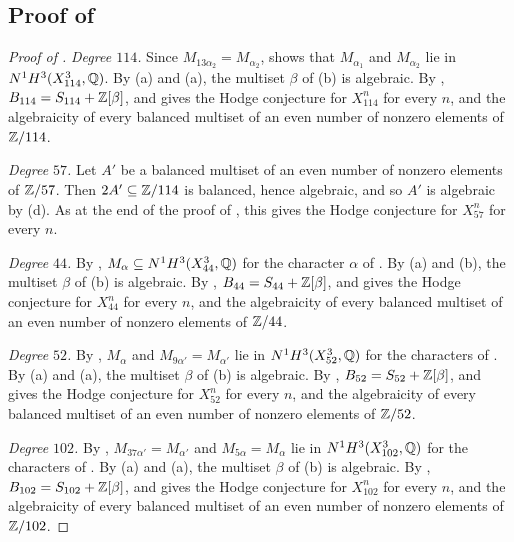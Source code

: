 \subsection{Proof of \texorpdfstring{}{Theorem A}}
\label{ssec:proof114}

\begin{proof}[Proof of ]
\emph{Degree $114$.} Since $M_{13\alpha_{2}}=M_{\alpha_{2}}$,
 shows that $M_{\alpha_{1}}$ and $M_{\alpha_{2}}$ lie in
$N^{1}H^{3}(X^{3}_{114},\mathbb{Q})$. By
(a) and (a), the multiset $\beta$
of (b) is algebraic. By ,
$B_{114}=S_{114}+\mathbb{Z}[\beta]$, and  gives the Hodge
conjecture for $X^{n}_{114}$ for every $n$, and the algebraicity of every
balanced multiset of an even number of nonzero elements of $\mathbb{Z}/114$.

\emph{Degree $57$.} Let $A'$ be a balanced multiset of an even number of
nonzero elements of $\mathbb{Z}/57$. Then $2A'\subseteq\mathbb{Z}/114$ is balanced, hence
algebraic, and so $A'$ is algebraic by (d). As at the
end of the proof of , this gives the Hodge conjecture for
$X^{n}_{57}$ for every $n$.

\emph{Degree $44$.} By , $M_{\alpha}\subseteq
N^{1}H^{3}(X^{3}_{44},\mathbb{Q})$ for the character $\alpha$ of
. By (a) and (b),
the multiset $\beta$ of (b) is algebraic. By
, $B_{44}=S_{44}+\mathbb{Z}[\beta]$, and  gives
the Hodge conjecture for $X^{n}_{44}$ for every $n$, and the algebraicity
of every balanced multiset of an even number of nonzero elements of
$\mathbb{Z}/44$.

\emph{Degree $52$.} By , $M_{\alpha}$ and
$M_{9\alpha'}=M_{\alpha'}$ lie in $N^{1}H^{3}(X^{3}_{52},\mathbb{Q})$ for the
characters of . By (a) and
(a), the multiset $\beta$ of (b) is
algebraic. By , $B_{52}=S_{52}+\mathbb{Z}[\beta]$, and
 gives the Hodge conjecture for $X^{n}_{52}$ for every
$n$, and the algebraicity of every balanced multiset of an even number of
nonzero elements of $\mathbb{Z}/52$.

\emph{Degree $102$.} By , $M_{37\alpha'}=M_{\alpha'}$ and
$M_{5\alpha}=M_{\alpha}$ lie in $N^{1}H^{3}(X^{3}_{102},\mathbb{Q})$ for the
characters of . By (a) and
(a), the multiset $\beta$ of (b) is
algebraic. By , $B_{102}=S_{102}+\mathbb{Z}[\beta]$, and
 gives the Hodge conjecture for $X^{n}_{102}$ for every
$n$, and the algebraicity of every balanced multiset of an even number of
nonzero elements of $\mathbb{Z}/102$.


\end{proof}
